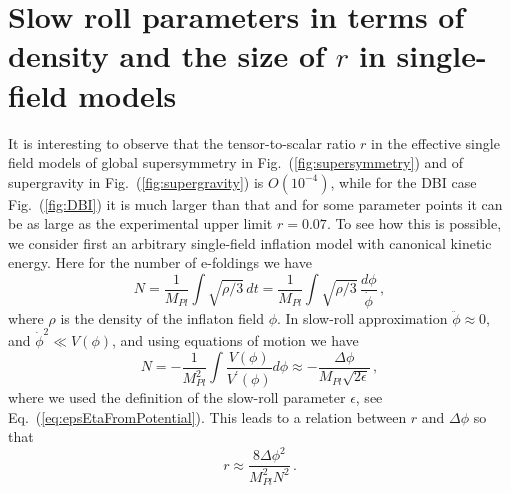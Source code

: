 \documentclass[12pt]{article}
\begin{document}
\section{Slow roll parameters in terms of density and the
size of  $r$ in single-field models \label{sec:r}}
It is interesting to observe that the tensor-to-scalar ratio $r$ in the effective single field models of global supersymmetry in Fig.~(\ref{fig:supersymmetry}) and of supergravity in Fig.~(\ref{fig:supergravity}) is $O\left(10^{-4}\right)$, while for the DBI case Fig.~(\ref{fig:DBI}) it is much larger than that and for some parameter points it can be as large as the experimental upper limit $r = 0.07$.
To see how this is possible, we consider first an arbitrary single-field inflation model with canonical kinetic energy.
Here for the number of e-foldings we have
\begin{equation} \label{eq:efoldingsGeneral}
  N = \frac{1}{M_{Pl}} \int \sqrt{\rho / 3}\,dt
    = \frac{1}{M_{Pl}} \int \sqrt{\rho / 3}\,\frac{d\phi}{\dot \phi}\,,
\end{equation}
where $\rho$ is the density of the inflaton field $\phi$.
In slow-roll approximation $\ddot \phi \approx 0$, and ${\dot \phi}^2 \ll V\left(\phi\right)$, and using equations of motion we have
\begin{equation} \label{eq:efoldingsCanonical}
  N = - \frac{1}{M_{Pl}^2} \int \frac{V\left(\phi\right)}{V^\prime\left(\phi\right)} d\phi
    \approx - \frac{\Delta \phi}{M_{Pl} \sqrt{2 \epsilon}}\,,
\end{equation}
where we used the definition of the slow-roll parameter $\epsilon$, see Eq.~(\ref{eq:epsEtaFromPotential}).
This leads to a relation between $r$ and $\Delta \phi$ so that
\begin{equation} \label{eq:Deltaphi}
  r \approx \frac{8 \Delta\phi^2}{M_{Pl}^2 N^2}\,.
\end{equation}
\end{document}
